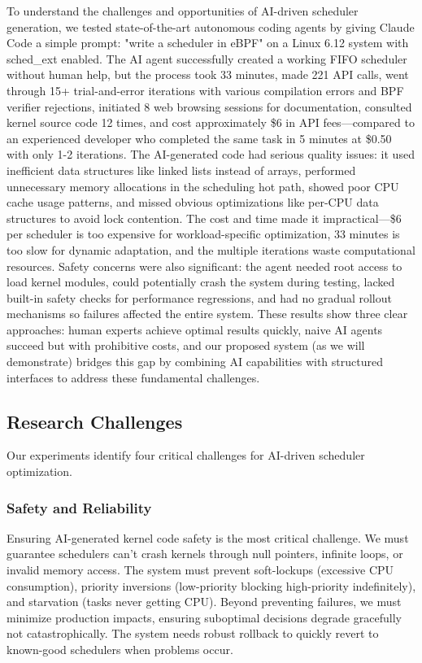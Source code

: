 To understand the challenges and opportunities of AI-driven scheduler generation, we tested state-of-the-art autonomous coding agents by giving Claude Code a simple prompt: "write a scheduler in eBPF" on a Linux 6.12 system with sched\_ext enabled. The AI agent successfully created a working FIFO scheduler without human help, but the process took 33 minutes, made 221 API calls, went through 15+ trial-and-error iterations with various compilation errors and BPF verifier rejections, initiated 8 web browsing sessions for documentation, consulted kernel source code 12 times, and cost approximately \$6 in API fees—compared to an experienced developer who completed the same task in 5 minutes at \$0.50 with only 1-2 iterations. The AI-generated code had serious quality issues: it used inefficient data structures like linked lists instead of arrays, performed unnecessary memory allocations in the scheduling hot path, showed poor CPU cache usage patterns, and missed obvious optimizations like per-CPU data structures to avoid lock contention. The cost and time made it impractical—\$6 per scheduler is too expensive for workload-specific optimization, 33 minutes is too slow for dynamic adaptation, and the multiple iterations waste computational resources. Safety concerns were also significant: the agent needed root access to load kernel modules, could potentially crash the system during testing, lacked built-in safety checks for performance regressions, and had no gradual rollout mechanisms so failures affected the entire system. These results show three clear approaches: human experts achieve optimal results quickly, naive AI agents succeed but with prohibitive costs, and our proposed system (as we will demonstrate) bridges this gap by combining AI capabilities with structured interfaces to address these fundamental challenges.

\subsection{Research Challenges}

Our experiments identify four critical challenges for AI-driven scheduler optimization.

\subsubsection{Safety and Reliability}

Ensuring AI-generated kernel code safety is the most critical challenge. We must guarantee schedulers can't crash kernels through null pointers, infinite loops, or invalid memory access. The system must prevent soft-lockups (excessive CPU consumption), priority inversions (low-priority blocking high-priority indefinitely), and starvation (tasks never getting CPU). Beyond preventing failures, we must minimize production impacts, ensuring suboptimal decisions degrade gracefully not catastrophically. The system needs robust rollback to quickly revert to known-good schedulers when problems occur.

